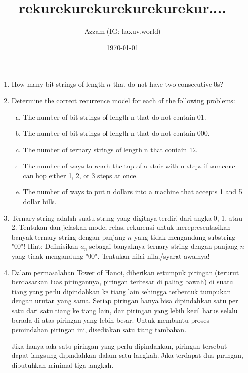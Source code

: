 \documentclass[12pt]{scrartcl}
\title{rekurekurekurekurekurekur....}
\author{Azzam (IG: haxuv.world)}
\date{\today}
\begin{document}
\maketitle

\renewcommand*\contentsname{Daftar Isi}
\tableofcontents

\newpage
\begin{enumerate}
    \item How many bit strings of length $n$ that do not have two consecutive 0s?

    \item Determine the correct recurrence model for each of the following problems:
    \begin{enumerate}[a)]
        \item The number of bit strings of length n that do not contain 01.
        \item The number of bit strings of length n that do not contain 000.
        \item  The number of ternary strings of length n that contain 12.
        \item The number of ways to reach the top of a stair with n steps if someone can hop either 1, 2, or 3 steps at once.
        \item The number of ways to put n dollars into a machine that accepts 1 and 5 dollar bills.
    \end{enumerate}

    \item Ternary-string adalah suatu string yang digitnya terdiri dari angka 0, 1, atau 2.
    Tentukan dan jelaskan model relasi rekurensi untuk merepresentasikan banyak ternary-string dengan panjang $n$ yang tidak mengandung substring "00"! Hint: Definisikan $a_n$ sebagai banyaknya ternary-string dengan panjang $n$ yang tidak mengandung "00". Tentukan nilai-nilai/syarat awalnya!

    \item Dalam permasalahan Tower of Hanoi, diberikan setumpuk piringan (terurut berdasarkan luas piringannya, piringan terbesar di paling bawah) di suatu tiang yang perlu dipindahkan ke tiang lain sehingga terbentuk tumpukan dengan urutan yang sama. Setiap piringan hanya bisa dipindahkan satu per satu dari satu tiang ke tiang lain, dan piringan yang lebih kecil harus selalu berada di atas piringan yang lebih besar. Untuk membantu proses pemindahan piringan ini, disediakan satu tiang tambahan.
    
    Jika hanya ada satu piringan yang perlu dipindahkan, piringan tersebut dapat langsung dipindahkan dalam satu langkah. Jika terdapat dua piringan, dibutuhkan minimal tiga langkah.
    

\end{enumerate}
\end{document}
